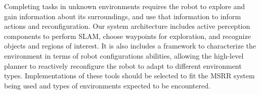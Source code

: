 \documentclass[12pt]{article}
\begin{document}


Completing tasks in unknown environments requires the robot to explore and gain information about its surroundings, and use that information to inform actions and reconfiguration.
Our system architecture includes active perception components to perform SLAM, choose waypoints for exploration, and recognize objects and regions of interest.  It is also includes a framework to characterize the environment in terms of robot configurations abilities, allowing the high-level planner to reactively reconfigure the robot to adapt to different environment types. Implementations of these tools should be selected to fit the MSRR system being used and types of environments expected to be encountered.
\end{document}
